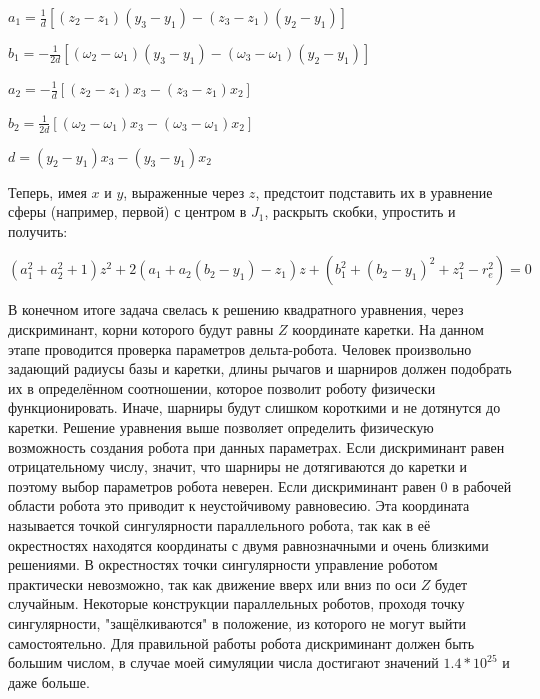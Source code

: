 \vspace{0.5cm}
\hspace{4cm} $a_{1} =\frac{1}{d}[(z_{2}-z_{1})(y_{3}-y_{1})-(z_{3}-z_{1})(y_{2}-y_{1})]$

\hspace{4cm} $b_{1} =-\frac{1}{2d}[(\omega_{2}-\omega_{1})(y_{3}-y_{1})-(\omega_{3}-\omega_{1})(y_{2}-y_{1})]$\\
\vspace{0.5cm}

\hspace{4cm} $a_{2} =-\frac{1}{d}[(z_{2}-z_{1})x_{3}-(z_{3}-z_{1})x_{2}]$

\hspace{4cm} $b_{2} =\frac{1}{2d}[(\omega_{2}-\omega_{1})x_{3}-(\omega_{3}-\omega_{1})x_{2}]$

\vspace{0.5cm}
\hspace{4cm} $d=(y_{2}-y_{1})x_{3} - (y_{3}-y_{1})x_{2}$\\
\vspace{0.75cm}

Теперь, имея $x$ и $y$, выраженные через $z$, предстоит подставить их в уравнение сферы (например, первой) с центром в $J_{1}$, раскрыть скобки, упростить и получить:

\begin{center}
$(a^{2}_{1}+a^{2}_{2}+1)z^{2} + 2(a_{1}+a_{2}(b_{2}-y_{1})-z_{1})z +(b^{2}_{1}+(b_{2}-y_{1})^2 +z^{2}_{1}-r^{2}_{e})=0$
\end{center}

В конечном итоге задача свелась к решению квадратного уравнения, через дискриминант, корни которого будут равны $Z$ координате каретки. На данном этапе проводится проверка параметров дельта-робота. Человек произвольно задающий радиусы базы и каретки, длины рычагов и шарниров должен подобрать их в определённом соотношении, которое позволит роботу физически функционировать. Иначе, шарниры будут слишком короткими и не дотянутся до каретки. Решение уравнения выше позволяет определить физическую возможность создания робота при данных параметрах. Если дискриминант равен отрицательному числу, значит, что шарниры не дотягиваются до каретки и поэтому выбор параметров робота неверен. Если дискриминант равен 0 в рабочей области робота это приводит к неустойчивому равновесию. Эта координата называется точкой сингулярности параллельного робота, так как в её окрестностях находятся координаты с двумя равнозначными и очень близкими решениями. В окрестностях точки сингулярности управление роботом практически невозможно, так как движение вверх или вниз по оси $Z$ будет случайным. Некоторые конструкции параллельных роботов, проходя точку сингулярности, "защёлкиваются" в положение, из которого не могут выйти самостоятельно. Для правильной работы робота дискриминант должен быть большим числом, в случае моей симуляции числа достигают значений $1.4*10^{25}$ и даже больше.

